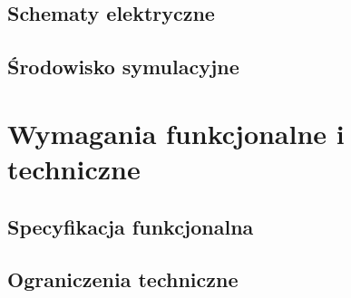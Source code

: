     \section{Schematy elektryczne}
        \noindent \lipsum[6-7]
        
    \section{Środowisko symulacyjne}
        \noindent \lipsum[8-9]


\clearpage\chapter{Wymagania funkcjonalne i techniczne}
    \noindent \lipsum[1-3]

    \section{Specyfikacja funkcjonalna}
        \noindent \lipsum[4-5]

    \section{Ograniczenia techniczne}
        \noindent \lipsum[6-7]